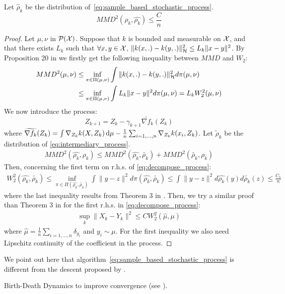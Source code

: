 \begin{proposition} Let $\widehat{\rho}_k$ be the distribution of~\eqref{eq:sample_based_stochastic_process}.
	\begin{equation}
	MMD^2(\rho_k,\widehat{\rho_k})\le \frac{C}{n}
	\end{equation}
\end{proposition}
\begin{proof}
	Let $\mu, \nu$ in $\mathcal{P}({{\mathcal X}})$. Suppose that $k$ is bounded and measurable on ${{\mathcal X}}$, and that there exists $L_k$ such that $\forall x,y \in {{\mathcal X}}$, $\| k(x,.)-k(y,.) \|_{{{\mathcal H}}}^2\le L_k \|x-y\|^2$. By Proposition 20 in \cite{sriperumbudur2010hilbert} we firstly get the following inequality between $MMD$ and $W_2$:
	\begin{align}
	MMD^2(\mu, \nu)	 &\le \inf_{\pi \in \Pi(\mu, \nu)} \int \| k(x,.)-k(y,.) \|_{{{\mathcal H}}}^2 d\pi(\mu, \nu)\\
	&\le  \inf_{\pi \in \Pi(\mu, \nu)} \int L_k \| x-y \|^2 d\pi(\mu, \nu)= L_k W_2^2(\mu, \nu)
	\end{align}
	We now introduce the process:
	\begin{equation}\label{eq:intermediary_process}
	Z_{k+1}=Z_k-\gamma_{k+1}\widetilde{\nabla f_k}(Z_k) 
	\end{equation}
	where $\widetilde{\nabla f_k}(Z_k)=\int \nabla_{Z_k}k(X,Z_k)\mathop{}\!\mathrm{d} \mu- \frac{1}{n}\sum_{i=1,\dots,n}\nabla_{Z_k}k(x_i,Z_k)$. Let $\widetilde{\rho}_k$ be the distribution of \eqref{eq:intermediary_process}.
	\begin{align}\label{eq:decompose_process}
	MMD^2(\widehat{\rho_k}, \rho_k) \le MMD^2(\widehat{\rho_k}, \widetilde{\rho_k})+ MMD^2(\widetilde{\rho_k}, \rho_k)
	\end{align}
	 Then, concerning the first term on r.h.s. of \eqref{eq:decompose_process}:
	 \begin{align}
	 W_2^2(\widehat{\rho_k}, \widetilde{\rho_k}) \le \inf_{\pi \in \Pi(\widehat{\rho_k}, \widetilde{\rho_k})} \int \| y-z \|^2 d\pi(\widehat{\rho_k}, \widetilde{\rho_k}) \le \int \|y-z\|^2 d\widehat{\rho_k}(y)d\widetilde{\rho_k}(z)\le \frac{C_1}{n}
	 \end{align}
	 where the last inequality results from Theorem 3 in \cite{jourdain2007nonlinear}. 
	 Then, we try a similar proof than Theorem 3 in \cite{jourdain2007nonlinear} for the first r.h.s. in \eqref{eq:decompose_process}:
	 \begin{align}
	 \sup_{k}\|X_k-Y_k\|^2 \le C W_2^2(\widehat{\mu},\mu)
	 \end{align}
	where $\widehat{\mu}=\frac{1}{n}\sum_{i=1, \dots,n}\delta_{y_i}$ and $y_i \sim \mu$. For the first inequality we also need Lipschitz continuity of the coefficient in the process.
\end{proof}

\begin{remark}
	We point out here that algorithm~\eqref{eq:sample_based_stochastic_process} is different from the descent proposed by \cite{mroueh2018regularized}. 
\end{remark}

\begin{remark}
	Birth-Death Dynamics to improve convergence (see \cite{rotskoff2019global}).
\end{remark}
